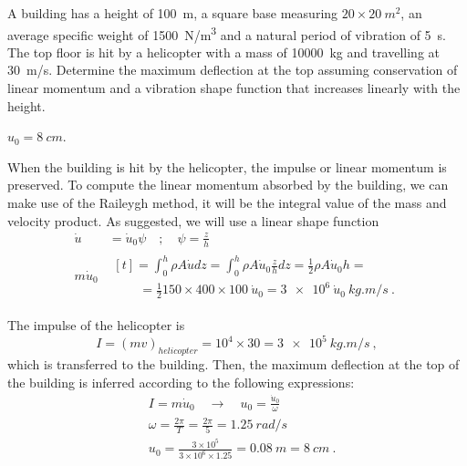 
\begin{Exercise}[label={helicopter_impulse}]
A building has a height of \SI{100}{m}, a square base measuring $20\times\SI{20}{m^2}$, an average specific weight of \SI{1500}{N/m^3} and a natural period of vibration of \SI{5}{s}. The top floor is hit by a helicopter with a mass of \SI{10000}{kg} and travelling at \SI{30}{m/s}. Determine the maximum deflection at the top assuming conservation of linear momentum and a vibration shape function that increases linearly with the height.

\begin{center}
\end{center}

\shortAnswer $u_0 = \SI{8}{cm}$.
\end{Exercise}



\begin{Answer}[ref={helicopter_impulse}]
When the building is hit by the helicopter, the impulse or linear momentum is preserved. To compute the linear momentum absorbed by the building, we can make use of the Raileygh method, it will be the integral value of the mass and velocity product. As suggested, we will use a linear shape function
\begin{align*}
\dot{u}& = \dot{u}_0\psi \quad ; \quad \psi = \frac{z}{h} \\
m\dot{u}_0& \begin{multlined}[t] = \int_0^h \rho A\dot{u}dz = \int_0^h \rho A\dot{u}_0\frac{z}{h}dz = \frac{1}{2}\rho A\dot{u}_0h = \\
    \qquad= \frac{1}{2}150\times400\times100\ \dot{u}_0
        = \num{3e6}\ \dot{u}_0\ \si{kg.m/s}\ .\end{multlined}
\end{align*}

The impulse of the helicopter is
$$
I = (mv)_{helicopter} = 10^4 \times 30 = \SI{3e5}{kg.m/s}\ ,
$$
which is transferred to the building. Then, the maximum deflection at the top of the building is inferred according to the following expressions:
\begin{align*}
&I = m\dot{u}_0 \quad \rightarrow \quad u_0 = \frac{\dot{u}_0}{\omega} \\
&\omega = \frac{2\pi}{T} = \frac{2\pi}{5} = \SI{1.25}{rad/s} \\
&u_0 = \frac{3\times 10^5}{3\times 10^6\times 1.25} = \SI{0.08}{m} = \SI{8}{cm}\ .
\end{align*}

\end{Answer}

